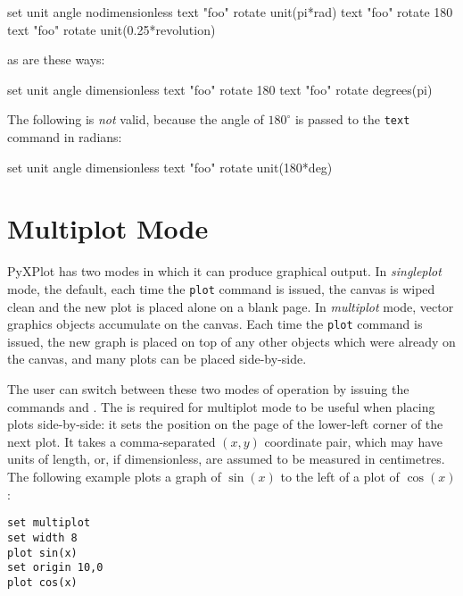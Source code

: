 \begin{dodo}
set unit angle nodimensionless\newline
text "foo" rotate unit(pi*rad)\newline
text "foo" rotate 180\newline
text "foo" rotate unit(0.25*revolution)
\end{dodo}

\noindent as are these ways:

\begin{dodo}
set unit angle dimensionless\newline
text "foo" rotate 180\newline
text "foo" rotate degrees(pi)
\end{dodo}

\noindent The following is {\it not} valid, because the angle of $180^\circ$ is
passed to the {\tt text} command in radians:

\begin{dontdo}
set unit angle dimensionless\newline
text "foo" rotate unit(180*deg)
\end{dontdo}

\section{Multiplot Mode}
\label{sec:multiplot}

PyXPlot has two modes in which it can produce graphical output. In {\it
singleplot} mode, the default, each time the {\tt plot} command is issued, the
canvas is wiped clean and the new plot is placed alone on a blank page. In {\it
multiplot} mode, vector graphics objects accumulate on the canvas. Each time
the {\tt plot} command is issued, the new graph is placed on top of any other
objects which were already on the canvas, and many plots can be placed
side-by-side.

The user can switch between these two modes of operation by issuing the
commands  and . The
 is required for multiplot mode to be useful when placing
plots side-by-side: it sets the position on the page of the lower-left corner
of the next plot. It takes a comma-separated $(x,y)$ coordinate pair, which may
have units of length, or, if dimensionless, are assumed to be measured in
centimetres. The following example plots a graph of $\sin(x)$ to the left of a
plot of $\cos(x)$:
\begin{verbatim}
set multiplot
set width 8
plot sin(x)
set origin 10,0
plot cos(x)
\end{verbatim}

